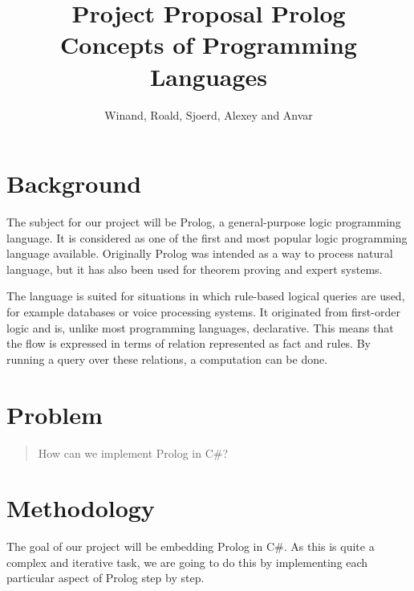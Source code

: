 \documentclass[a4paper]{article}
\title{Project Proposal Prolog\\
\vspace{1em}
\large Concepts of Programming Languages
}
\author{Winand, Roald, Sjoerd, Alexey and Anvar} %
\begin{document}
\maketitle

\section{Background}

The subject for our project will be Prolog, a general-purpose logic programming language.
It is considered as one of the first and most popular logic programming language available.
Originally Prolog was intended as a way to process natural language, but it has also been used for theorem proving and expert systems.

The language is suited for situations in which rule-based logical queries are used, for example databases or voice processing systems.
It originated from first-order logic and is, unlike most programming languages, declarative.
This means that the flow is expressed in terms of relation represented as fact and rules.
By running a query over these relations, a computation can be done.


\section{Problem}
\begin{quote}
How can we implement Prolog in C\#?
\end{quote}

\section{Methodology}

The goal of our project will be embedding Prolog in C\#.
As this is quite a complex and iterative task, we are going to do this by implementing each particular aspect of Prolog step by step.
\end{document}
